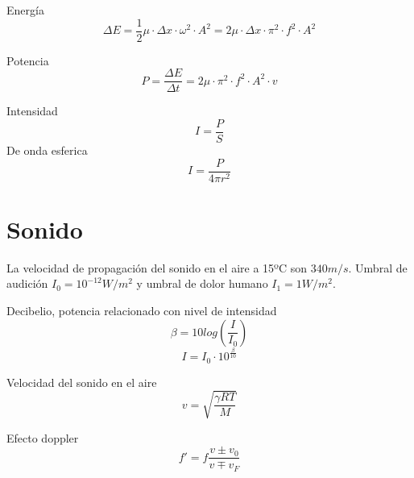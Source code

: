 \documentclass[12pt, letterpaper, twoside]{article}
\begin{document}
	Energía
	\begin{equation}
		\Delta E = \frac{1}{2} \mu \cdot \Delta x \cdot \omega^2 \cdot A^2 = 2 \mu \cdot \Delta x \cdot \pi^2 \cdot f^2 \cdot A^2
	\end{equation}

	Potencia
	\begin{equation}
		P = \frac{\Delta E}{\Delta t} = 2 \mu \cdot \pi^2 \cdot f^2 \cdot A^2 \cdot v
	\end{equation}
	
	Intensidad
	\begin{equation}
		I = \frac{P}{S}
	\end{equation}
	De onda esferica
	\begin{equation}
		I = \frac{P}{4 \pi r^2}
	\end{equation}
	
	\section{Sonido}
	La velocidad de propagación del sonido en el aire a 15ºC son $340m/s$.
	Umbral de audición $I_0 = 10^{-12} W/m^2$ y umbral de dolor humano $I_1 = 1W/m^2$.
	
	Decibelio, potencia relacionado con nivel de intensidad
	\begin{equation}
		\beta = 10 log (\frac{I}{I_0})
	\end{equation}
	\begin{equation}
		I = I_0 \cdot 10^{\frac{\beta}{10}}
	\end{equation}

	Velocidad del sonido en el aire
	\begin{equation}
		v = \sqrt{\frac{\gamma R T}{M}}
	\end{equation}

	Efecto doppler
	\begin{equation}
		f' = f \frac{v \pm v_0}{v \mp v_F}
	\end{equation}
\end{document}
